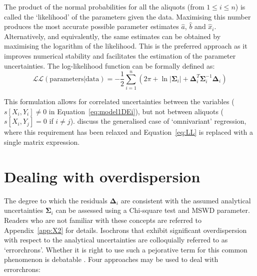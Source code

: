 \documentclass{article}
\begin{document}
The product of the normal probabilities for all the aliquots (from
$1\leq{i}\leq{n}$) is called the `likelihood' of the parameters given
the data. Maximising this number produces the most accurate possible
parameter estimates $\hat{a}$, $\hat{b}$ and
$\hat{x}_i$. Alternatively, and equivalently, the same estimates can
be obtained by maximising the logarithm of the likelihood.  This is
the preferred approach as it improves numerical stability and
facilitates the estimation of the parameter uncertainties. The
log-likelihood function can be formally defined as:
\begin{equation}
  \mathcal{LL}(\mbox{parameters}|\mbox{data}) =
  - \frac{1}{2}
  \sum\limits_{i=1}^{n} \left( 2\pi +
  \ln|\mathbf{\Sigma}_i| +
  \mathbf{\Delta}_i^T \mathbf{\Sigma}_i^{-1} \mathbf{\Delta}_i \right)
  \label{eq:LL}
\end{equation}

This formulation allows for correlated uncertainties between the
variables ($s[X_i,Y_i]\neq{0}$ in Equation~\ref{eq:model1DEi}), but
not between aliquots ($s[X_i,Y_j]={0}$ if
${i}\neq{j}$). \citet{daeron2023} discuss the generalised case of
`omnivariant' regression, where this requirement has been relaxed and
Equation~\ref{eq:LL} is replaced with a single matrix expression.

\section{Dealing with overdispersion}\label{sec:overdispersion}

The degree to which the residuals $\mathbf{\Delta}_i$ are consistent
with the assumed analytical uncertainties $\mathbf{\Sigma}_i$ can be
assessed using a Chi-square test and MSWD parameter. Readers who are
not familiar with these concepts are referred to Appendix~\ref{app:X2}
for details. Isochrons that exhibit significant overdispersion with
respect to the analytical uncertainties are colloquially referred to
as `errorchrons'. Whether it is right to use such a pejorative term
for this common phenomenon is debatable \citep{schaen2021}.  Four
approaches may be used to deal with errorchrons:
\end{document}
